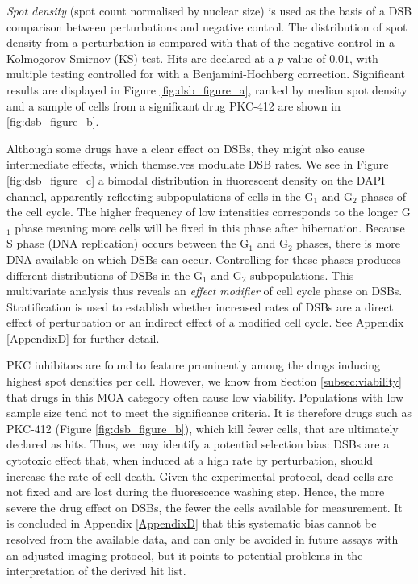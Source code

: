 \emph{Spot density} (spot count normalised by nuclear size) is used as the basis of a DSB comparison between perturbations and negative control. The distribution of spot density from a perturbation is compared with that of the negative control in a Kolmogorov-Smirnov (KS) test. Hits are declared at a $p$-value of $0.01$, with multiple testing controlled for with a Benjamini-Hochberg correction. Significant results are displayed in Figure \ref{fig:dsb_figure_a}, ranked by median spot density and a sample of cells from a significant drug PKC-412 are shown in \ref{fig:dsb_figure_b}. 

Although some drugs have a clear effect on DSBs, they might also cause intermediate effects, which themselves modulate DSB rates. We see in Figure \ref{fig:dsb_figure_c} a bimodal distribution in fluorescent density on the DAPI channel, apparently reflecting subpopulations of cells in the G$_1$ and G$_2$ phases of the cell cycle. The higher frequency of low intensities corresponds to the longer G$_1$ phase meaning more cells will be fixed in this phase after hibernation. Because S phase (DNA replication) occurs between the G$_1$ and G$_2$ phases, there is more DNA available on which DSBs can occur.  Controlling for these phases produces different distributions of DSBs in the G$_1$ and G$_2$ subpopulations. This multivariate analysis thus reveals an \emph{effect modifier} of cell cycle phase on DSBs. Stratification is used to establish whether increased rates of DSBs are a direct effect of perturbation or an indirect effect of a modified cell cycle. See Appendix \ref{AppendixD} for further detail.

PKC inhibitors are found to feature prominently among the drugs inducing highest spot densities per cell. However, we know from Section \ref{subsec:viability} that drugs in this MOA category often cause low viability. Populations with low sample size tend not to meet the significance criteria. It is therefore drugs such as PKC-412 (Figure \ref{fig:dsb_figure_b}), which kill fewer cells, that are ultimately declared as hits. Thus, we may identify a potential selection bias: DSBs are a cytotoxic effect that, when induced at a high rate by perturbation, should increase the rate of cell death. Given the experimental protocol, dead cells are not fixed and are lost during the fluorescence washing step. Hence, the more severe the drug effect on DSBs, the fewer the cells available for measurement. It is concluded in Appendix \ref{AppendixD} that this systematic bias cannot be resolved from the available data, and can only be avoided in future assays with an adjusted imaging protocol, but it points to potential problems in the interpretation of the derived hit list.

